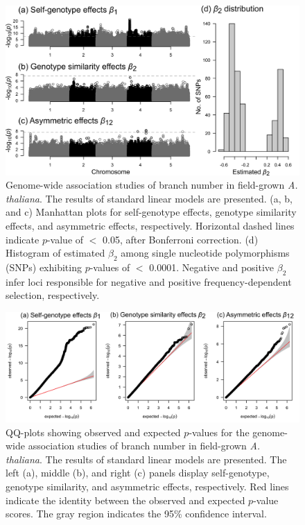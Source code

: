 \documentclass[12pt,]{article}
\begin{document}
\begin{figure}[]
  \includegraphics[width=\linewidth]{ManhattanPlotLM.png}
  \caption{Genome-wide association studies of branch number in field-grown \textit{A. thaliana}. The results of standard linear models are presented. (a, b, and c) Manhattan plots for self-genotype effects, genotype similarity effects, and asymmetric effects, respectively. Horizontal dashed lines indicate $p$-value of $<$ 0.05, after Bonferroni correction. (d) Histogram of estimated $\beta_2$ among single nucleotide polymorphisms (SNPs) exhibiting $p$-values of $<$ 0.0001. Negative and positive $\beta_2$ infer loci responsible for negative and positive frequency-dependent selection, respectively.}
  \label{figS10:gwasLM}
\end{figure}


\begin{figure}[]
  \includegraphics[width=\linewidth]{QQplotLM.png}
  \caption{QQ-plots showing observed and expected $p$-values for the genome-wide association studies of branch number in field-grown \textit{A. thaliana}. The results of standard linear models are presented. The left (a), middle (b), and right (c) panels display self-genotype, genotype similarity, and asymmetric effects, respectively. Red lines indicate the identity between the observed and expected $p$-value scores. The gray region indicates the 95\% confidence interval.}
  \label{figS11:QQplotLM}
\end{figure}
\end{document}
